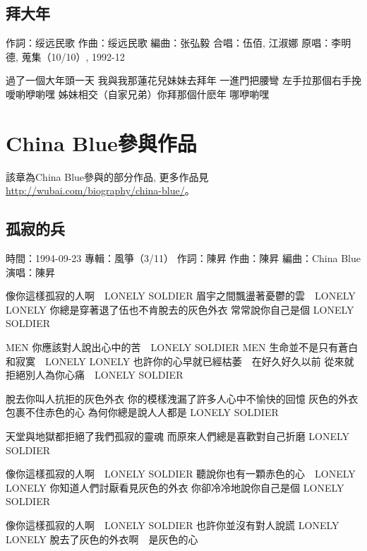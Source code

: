 \documentclass[UTF8,a4paper,oneside,twocolumn,12pt]{ctexbook}
\newcommand{\infopair}[2]{\textbullet #1：#2}
\newcommand{\zc}[1][伍佰]{\infopair{作詞}{#1}}
\newcommand{\zq}[1][伍佰]{\infopair{作曲}{#1}}
\newcommand{\bq}[1][伍佰]{\infopair{編曲}{#1}}
\newcommand{\zj}[1]{\infopair{專輯}{#1}}
\newcommand{\yc}[1]{\infopair{原唱}{#1}}
\newcommand{\sj}[1]{\infopair{時間}{#1}}
\newenvironment{info}{\begin{flushleft}\kaishu
	}
	{\end{flushleft}\normalsize\yahei\par}
\newenvironment{lyric}{
	}
{}
\begin{document}
\section{拜大年}%
\begin{info}
	\zc[绥远民歌]%
	\zq[绥远民歌]
	\bq[张弘毅]
	\infopair{合唱}{伍佰, 江淑娜}
	\yc{李明德, 蒐集（10/10）, 1992-12}
\end{info}
\begin{lyric}
	過了一個大年頭一天
	我與我那蓮花兒妹妹去拜年
	一進門把腰彎
	左手拉那個右手挽
	噯喲咿喲嘿
	姊妹相交（自家兄弟）你拜那個什麽年
	哪咿喲嘿
\end{lyric}

\chapter{China Blue參與作品}
該章為China Blue參與的部分作品, 更多作品見 \url{http://wubai.com/biography/china-blue/}。%

\section{孤寂的兵}
\begin{info}%
	\sj{1994-09-23}
	\zj{風箏（3/11）}
	\zc[陳昇]
	\zq[陳昇]
	\bq[China Blue]
	\infopair{演唱}{陳昇}
\end{info}
\begin{lyric}%
	像你這樣孤寂的人啊　LONELY SOLDIER
	眉宇之間飄盪著憂鬱的雲　LONELY LONELY
	你總是穿著退了伍也不肯脫去的灰色外衣
	常常說你自己是個 LONELY SOLDIER

	MEN 你應該對人說出心中的苦　LONELY SOLDIER
	MEN 生命並不是只有蒼白和寂寞　LONELY LONELY
	也許你的心早就已經枯萎　在好久好久以前
	從來就拒絕別人為你心痛　LONELY SOLDIER

	脫去你叫人抗拒的灰色外衣
	你的模樣洩漏了許多人心中不愉快的回憶
	灰色的外衣包裹不住赤色的心
	為何你總是說人人都是 LONELY SOLDIER

	天堂與地獄都拒絕了我們孤寂的靈魂
	而原來人們總是喜歡對自己折磨 LONELY SOLDIER

	像你這樣孤寂的人啊　LONELY SOLDIER
	聽說你也有一顆赤色的心　LONELY LONELY
	你知道人們討厭看見灰色的外衣
	你卻冷冷地說你自己是個 LONELY SOLDIER

	像你這樣孤寂的人啊　LONELY SOLDIER
	也許你並沒有對人說謊 LONELY LONELY
	脫去了灰色的外衣啊　是灰色的心
\end{lyric}
\end{document}
